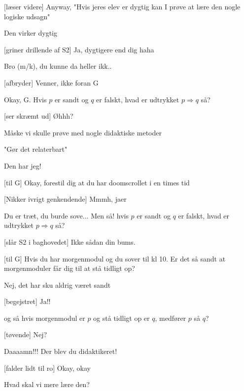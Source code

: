 \documentclass[a4paper,11pt]{article}
\begin{document}
\begin{sketch}

[læser videre] Anyway,  "Hvis jeres elev er dygtig kan I prøve at lære den nogle logiske udsagn"

 Den virker dygtig

[griner drillende af S2] Ja, dygtigere end dig haha

 Bro (m/k), du kunne da heller ikk..

[afbryder] Venner, ikke foran G

 Okay, G. Hvis $p$ er sandt og $q$ er falskt, hvad er udtrykket $p \Rightarrow q$ så?

[ser skræmt ud] Øhhh?

 Måske vi skulle prøve med nogle didaktiske metoder


 "Gør det relaterbart"

 Den har jeg!

[til G] Okay, forestil dig at du har doomscrollet i en times tid

[Nikker ivrigt genkendende] Mmmh, jaer

 Du er træt, du burde sove... Men så! hvis $p$ er sandt og $q$ er falskt, hvad er udtrykket $p \Rightarrow q$ så?

[slår S2 i baghovedet] Ikke sådan din bums. 

[til G] Hvis du har morgenmodul og du sover til kl 10. Er det så sandt at morgenmoduler får dig til at stå tidligt op?

 Nej, det har sku aldrig været sandt

[begejstret] Ja!!

 og så hvis morgenmodul er $p$ og stå tidligt op er $q$, medfører $p$ så $q$?

[tøvende] Nej?


 Daaaamn!!! Der blev du didaktikeret!


[falder lidt til ro] Okay, okay

 Hvad skal vi mere lære den?



\end{sketch}
\end{document}
